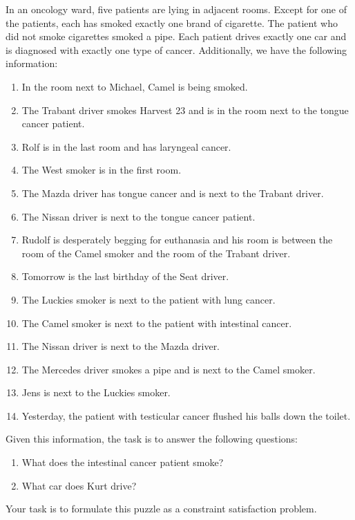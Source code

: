\exercise
In an oncology ward, five patients are lying in adjacent rooms. Except for one of the patients, each has smoked
exactly one brand of cigarette. The patient who did not smoke cigarettes smoked a pipe. Each patient drives
exactly one car and is diagnosed with exactly one type of cancer. Additionally, we have the following
information: 
\begin{enumerate}
\item In the room next to Michael, Camel is being smoked.
\item The Trabant driver smokes Harvest 23 and is in the room next to the tongue cancer patient.
\item Rolf is in the last room and has laryngeal cancer.
\item The West smoker is in the first room.
\item The Mazda driver has tongue cancer and is next to the Trabant driver.
\item The Nissan driver is next to the tongue cancer patient.
\item Rudolf is desperately begging for euthanasia and his room is between the room of the Camel smoker and the
      room of the Trabant driver.
\item Tomorrow is the last birthday of the Seat driver.
\item The Luckies smoker is next to the patient with lung cancer.
\item The Camel smoker is next to the patient with intestinal cancer.
\item The Nissan driver is next to the Mazda driver.
\item The Mercedes driver smokes a pipe and is next to the Camel smoker.
\item Jens is next to the Luckies smoker.
\item Yesterday, the patient with testicular cancer flushed his balls down the toilet.
\end{enumerate}
Given this information, the task is to answer the following questions:
\begin{enumerate}
\item What does the intestinal cancer patient smoke?
\item What car does Kurt drive?
\end{enumerate}
Your task is to formulate this puzzle as a constraint satisfaction problem. \eox

